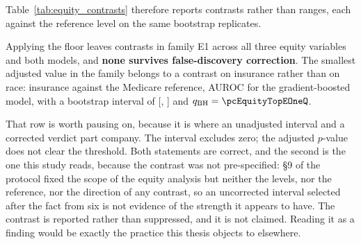 Table~\ref{tab:equity_contrasts} therefore reports contrasts rather than
ranges, each against the reference level on the same bootstrap replicates.

\begin{table}[H]
    \centering\footnotesize
    \caption{Exploratory family E1 in full: all \pcEquityNContrastsEOne{}
    subgroup AUROC contrasts clearing the \pcMinSubgroupEvents{}-event floor,
    across race, language and insurance and for both fitted models, ordered by
    adjusted $p$-value. $q_{\text{BH}}$ is the Benjamini--Hochberg adjusted
    value over the whole family. \textbf{No contrast is significant}, on race or
    on any other variable. Two intervals still exclude zero, which is the
    distinction the surrounding text turns on: an unadjusted interval and a
    family-corrected verdict answer different questions, and only the second is
    read here. The reference level is the largest stratum of its own variable
    and, for race, is a residual administrative category rather than a
    population (Section~\ref{sec:equity_strata}). \textbf{[E] exploratory.}}
    \label{tab:equity_contrasts}
\end{table}

Applying the floor leaves \pcEquityNContrastsEOne{} contrasts in family E1
across all three equity variables and both models, and \textbf{none survives
false-discovery correction}. The smallest adjusted value in the family belongs
to a contrast on insurance rather than on race: \pcEquityTopEOneLevel{}
insurance against the Medicare reference, \pcEquityTopEOneDelta{} AUROC for the
gradient-boosted model, with a bootstrap interval of
[\pcEquityTopEOneCiLo, \pcEquityTopEOneCiHi] and
$q_{\text{BH}} = \pcEquityTopEOneQ$.

That row is worth pausing on, because it is where an unadjusted interval and a
corrected verdict part company. The interval excludes zero; the adjusted
$p$-value does not clear the threshold. Both statements are correct, and the
second is the one this study reads, because the contrast was not pre-specified:
§9 of the protocol fixed the scope of the equity analysis but neither the
levels, nor the reference, nor the direction of any contrast, so an uncorrected
interval selected after the fact from six is not evidence of the strength it
appears to have. The contrast is reported rather than suppressed, and it is not
claimed. Reading it as a finding would be exactly the practice this thesis
objects to elsewhere.


